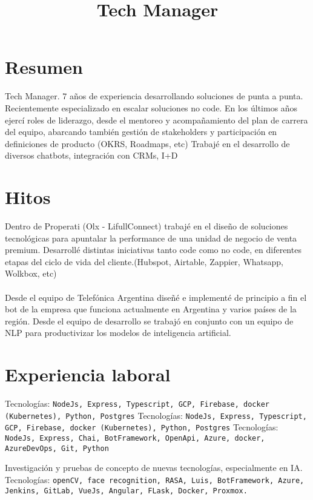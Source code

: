 \documentclass[11pt,a4paper,sans]{moderncv}
\title{Tech Manager}
\begin{document}
\maketitle
\section{Resumen}

Tech Manager. 7 años de experiencia desarrollando soluciones de punta a punta. Recientemente especializado en escalar soluciones no code.
En los últimos años ejercí roles de liderazgo, desde el mentoreo y acompañamiento del plan de carrera del equipo, abarcando también gestión de stakeholders y participación en definiciones de producto (OKRS, Roadmaps, etc)
Trabajé en el desarrollo de diversos chatbots, integración con CRMs, I+D

\section{Hitos}
Dentro de Properati (Olx - LifullConnect) trabajé en el diseño de soluciones tecnológicas para apuntalar la performance de una unidad de negocio de venta premium. Desarrollé distintas iniciativas tanto code como no code, en diferentes etapas del ciclo de vida del cliente.(Hubspot, Airtable, Zappier, Whatsapp, Wolkbox, etc)
\\ \\
Desde el equipo de Telefónica Argentina diseñé e implementé de principio a fin el bot de la empresa que funciona actualmente en Argentina y varios países de la región. Desde el equipo de desarrollo se trabajó en conjunto con un equipo de NLP para productivizar los modelos de inteligencia artificial.

\section{Experiencia laboral}
{Tecnolog\'ias: \texttt{NodeJs, Express, Typescript, GCP, Firebase, docker (Kubernetes), Python, Postgres}}
{Tecnolog\'ias: \texttt{NodeJs, Express, Typescript, GCP, Firebase, docker (Kubernetes), Python, Postgres}}
{Tecnolog\'ias: \texttt{NodeJs, Express, Chai, BotFramework, OpenApi, Azure, docker, AzureDevOps, Git, Python}}

{ Investigación y pruebas de concepto de nuevas tecnologías, especialmente en IA. Tecnolog\'ias: \texttt{openCV, face recognition, RASA, Luis, BotFramework, Azure, Jenkins, GitLab, VueJs, Angular, FLask, Docker, Proxmox.}}
\end{document}
